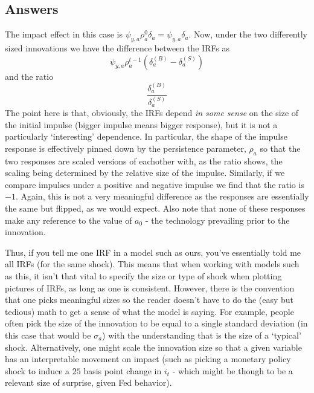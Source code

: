 \documentclass[authoryear,11pt]{elsarticle}
\begin{document}
\subsection*{Answers}
The impact effect in this case is $\psi_{y,a} \rho_a^0 \delta_{a} = \psi_{y,a} \delta_{a}$. Now, under the two differently sized innovations we have the difference between the IRFs as
\[
\psi_{y,a} \rho_{a}^{t-1} (\delta_{a}^{(B)} - \delta_{a}^{(S)})
\]
and the ratio
\[
\frac{\delta_{a}^{(B)}}{\delta_{a}^{(S)}}
\]
The point here is that, obviously, the IRFs depend \emph{in some sense} on the size of the initial impulse (bigger impulse means bigger response), but it is not a particularly `interesting' dependence. In particular, the shape of the impulse response is effectively pinned down by the persistence parameter, $\rho_{a}$ so that the two responses are scaled versions of eachother with, as the ratio shows, the scaling being determined by the relative size of the impulse. Similarly, if we compare impulses under a positive and negative impulse we find that the ratio is $-1$. Again, this is not a very meaningful difference as the responses are essentially the same but flipped, as we would expect. Also note that none of these responses make any reference to the value of $a_{0}$ - the technology prevailing prior to the innovation.

Thus, if you tell me one IRF in a model such as ours, you've essentially told me all IRFs (for the same shock). This means that when working with models such as this, it isn't that vital to specify the size or type of shock when plotting pictures of IRFs, as long as one is consistent. However, there is the convention that one picks meaningful sizes so the reader doesn't have to do the (easy but tedious) math to get a sense of what the model is saying. For example, people often pick the size of the innovation to be equal to a single standard deviation (in this case that would be $\sigma_{a}$) with the understanding that is the size of a `typical' shock. Alternatively, one might scale the innovation size so that a given variable has an interpretable movement on impact (such as picking a monetary policy shock to induce a $25$ basis point change in $i_{t}$ - which might be though to be a relevant size of surprise, given Fed behavior).
\end{document}
